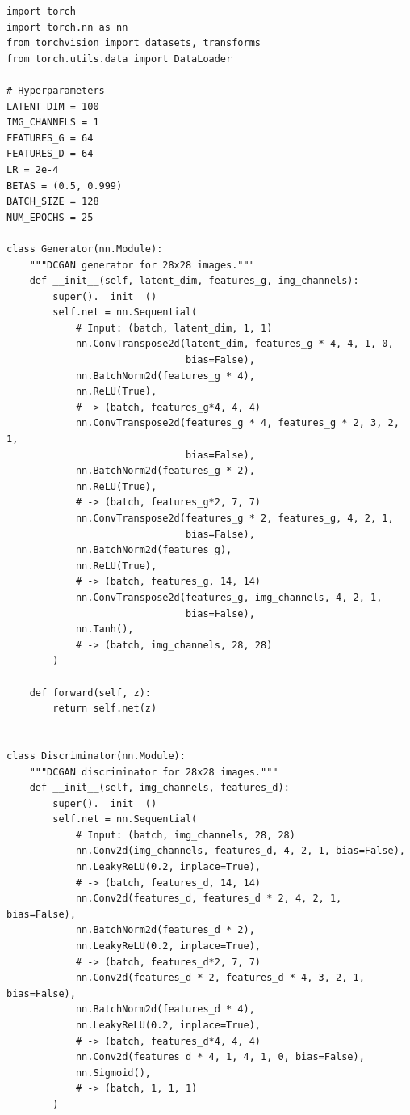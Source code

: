\begin{codeblock}[title=\textbf{Complete DCGAN with training loop}]
\begin{verbatim}
import torch
import torch.nn as nn
from torchvision import datasets, transforms
from torch.utils.data import DataLoader

# Hyperparameters
LATENT_DIM = 100
IMG_CHANNELS = 1
FEATURES_G = 64
FEATURES_D = 64
LR = 2e-4
BETAS = (0.5, 0.999)
BATCH_SIZE = 128
NUM_EPOCHS = 25

class Generator(nn.Module):
    """DCGAN generator for 28x28 images."""
    def __init__(self, latent_dim, features_g, img_channels):
        super().__init__()
        self.net = nn.Sequential(
            # Input: (batch, latent_dim, 1, 1)
            nn.ConvTranspose2d(latent_dim, features_g * 4, 4, 1, 0,
                               bias=False),
            nn.BatchNorm2d(features_g * 4),
            nn.ReLU(True),
            # -> (batch, features_g*4, 4, 4)
            nn.ConvTranspose2d(features_g * 4, features_g * 2, 3, 2, 1,
                               bias=False),
            nn.BatchNorm2d(features_g * 2),
            nn.ReLU(True),
            # -> (batch, features_g*2, 7, 7)
            nn.ConvTranspose2d(features_g * 2, features_g, 4, 2, 1,
                               bias=False),
            nn.BatchNorm2d(features_g),
            nn.ReLU(True),
            # -> (batch, features_g, 14, 14)
            nn.ConvTranspose2d(features_g, img_channels, 4, 2, 1,
                               bias=False),
            nn.Tanh(),
            # -> (batch, img_channels, 28, 28)
        )

    def forward(self, z):
        return self.net(z)


class Discriminator(nn.Module):
    """DCGAN discriminator for 28x28 images."""
    def __init__(self, img_channels, features_d):
        super().__init__()
        self.net = nn.Sequential(
            # Input: (batch, img_channels, 28, 28)
            nn.Conv2d(img_channels, features_d, 4, 2, 1, bias=False),
            nn.LeakyReLU(0.2, inplace=True),
            # -> (batch, features_d, 14, 14)
            nn.Conv2d(features_d, features_d * 2, 4, 2, 1, bias=False),
            nn.BatchNorm2d(features_d * 2),
            nn.LeakyReLU(0.2, inplace=True),
            # -> (batch, features_d*2, 7, 7)
            nn.Conv2d(features_d * 2, features_d * 4, 3, 2, 1, bias=False),
            nn.BatchNorm2d(features_d * 4),
            nn.LeakyReLU(0.2, inplace=True),
            # -> (batch, features_d*4, 4, 4)
            nn.Conv2d(features_d * 4, 1, 4, 1, 0, bias=False),
            nn.Sigmoid(),
            # -> (batch, 1, 1, 1)
        )


\end{verbatim}
\end{codeblock}
